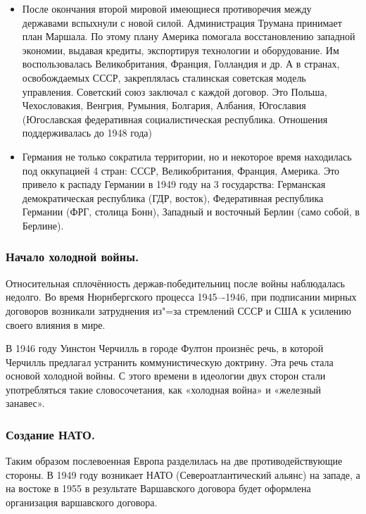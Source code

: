 \begin{itemize}
    \item После окончания второй мировой имеющиеся противоречия между державами вспыхнули с новой силой. Администрация Трумана принимает план Маршала. По этому плану Америка помогала восстановлению западной экономии, выдавая кредиты, экспортируя технологии и оборудование. Им воспользовалась Великобритания, Франция, Голландия и др. А в странах, освобождаемых СССР, закреплялась сталинская советская модель управления. Советский союз заключал с каждой договор. Это Польша, Чехословакия, Венгрия, Румыния, Болгария, Албания, Югославия (Югославская федеративная социалистическая республика. Отношения поддерживалась до 1948 года)
    \item Германия не только сократила территории, но и некоторое время находилась под оккупацией 4 стран: СССР, Великобритания, Франция, Америка. Это привело к распаду Германии в 1949 году на 3 государства: Германская демократическая республика (ГДР, восток), Федеративная республика Германии (ФРГ, столица Бонн), Западный и восточный Берлин (само собой, в Берлине).
\end{itemize}

\subsubsection{\textbf{Начало холодной войны.}}

Относительная сплочённость держав-победительниц после войны наблюдалась недолго. Во время Нюрнбергского процесса 1945–-1946, при подписании мирных договоров возникали затруднения из"=за стремлений СССР и США к усилению своего влияния в мире.

В 1946 году Уинстон Черчилль в городе Фултон произнёс речь, в которой Черчилль предлагал устранить коммунистическую доктрину. Эта речь стала основой холодной войны. С этого времени в идеологии двух сторон стали употребляться такие словосочетания, как «холодная война» и «железный занавес». 

\subsubsection{\textbf{Создание НАТО.}}

Таким образом послевоенная Европа разделилась на две противодействующие стороны. В 1949 году возникает НАТО (Североатлантический альянс) на западе, а на востоке в 1955 в результате Варшавского договора будет оформлена организация варшавского договора. 

